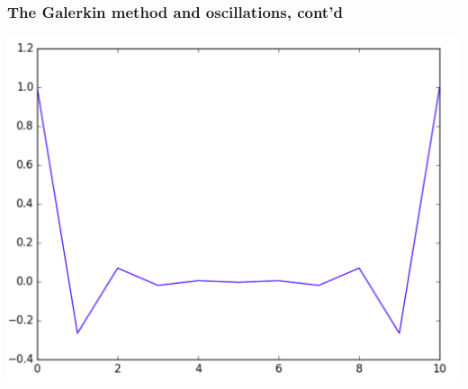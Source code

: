 \begin{frame}
\frametitle{The Galerkin method and oscillations, cont'd}
 \includegraphics[width=\textwidth]{png/fenics_simpleK.png}
\end{frame}
